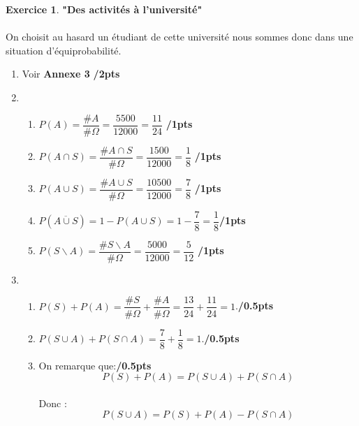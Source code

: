 \documentclass[a4paper,11pt]{article}
\theoremstyle{definition}
\newtheorem{exo}{Exercice}
\begin{document}
\begin{exo}\textbf{"Des activités à l'université"}\\\hfil\\
	On choisit au hasard un étudiant de cette université nous sommes donc dans une situation d'équiprobabilité.

		\begin{enumerate}
			\item Voir \textbf{Annexe 3} \hfill\textbf{/2pts}
			
			\item  
			\begin{enumerate}
				\item $P(A) = \dfrac{\#A}{\#\Omega} = \dfrac{5500}{12000} = \dfrac{11}{24}$ \hfill\textbf{/1pts}\\[0.2cm]
				\item $P(A\cap S) = \dfrac{\#A\cap S}{\#\Omega} = \dfrac{1500}{12000} = \dfrac{1}{8}$ \hfill\textbf{/1pts}\\[0.2cm]
				\item $P(A\cup S) = \dfrac{\#A\cup S}{\#\Omega} = \dfrac{10500}{12000} = \dfrac{7}{8}$ \hfill\textbf{/1pts}\\[0.2cm]
				\item $P(\overline{A\cup S}) = 1 -P(A\cup S) =1- \dfrac{7}{8} = \dfrac{1}{8}$\hfill\textbf{/1pts}\\[0.2cm]
				\item  $P(S\backslash A) = \dfrac{\#S\backslash A}{\#\Omega} = \dfrac{5000}{12000} = \dfrac{5}{12}$ \hfill\textbf{/1pts}
				
				
			\end{enumerate}
			\item \begin{enumerate}
				\item $P(S) + P(A) = \dfrac{\#S}{\#\Omega} + \dfrac{\#A}{\#\Omega} = \dfrac{13}{24} + \dfrac{11}{24} = 1 $.\hfill\textbf{/0.5pts}\\[0.25cm]
				\item $P(S\cup A) + P(S\cap A) = \dfrac{7}{8} + \dfrac{1}{8} = 1 $.\hfill\textbf{/0.5pts}\\[0.25cm]
				\item On remarque que:\hfill\textbf{/0.5pts}\\ 
				$$P(S) + P(A) = P(S\cup A) + P(S\cap A)$$\\
				 Donc : $$P(S\cup A) = P(S) + P(A) - P(S\cap A)$$
			\end{enumerate}\end{enumerate}

	
\end{exo}
\chead{}\renewcommand{\headrulewidth}{0.4pt}\renewcommand{\footrulewidth}{0.4pt}	
\end{document}
